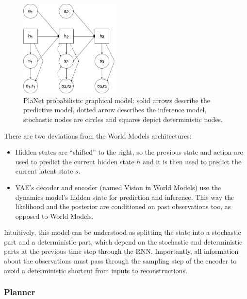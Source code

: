 \begin{figure}[H]
\includegraphics[width=0.45\textwidth,keepaspectratio]{figures/PlaNet/prob_graph_model.png}
\caption[World Models probabilistic graphical model]{PlaNet probabilistic graphical model: solid arrows describe the predictive model, dotted arrow describes the inference model, stochastic nodes are circles and squares depict deterministic nodes.}
\label{Fig.PlaNetPGM}
\end{figure}

\noindent There are two deviations from the World Models architectures:
\begin{itemize}
\item Hidden states are ``shifted'' to the right, so the previous state and action are used to predict the current hidden state $h$ and it is then used to predict the current latent state $s$.
\item VAE's decoder and encoder (named Vision in World Models) use the dynamics model's hidden state for prediction and inference. This way the likelihood and the posterior are conditioned on past observations too, as opposed to World Models.
\end{itemize}

Intuitively, this model can be understood as splitting the state into a stochastic part and a deterministic part, which depend on the stochastic and deterministic parts at the previous time step through the RNN. Importantly, all information about the observations must pass through the sampling step of the encoder to avoid a deterministic shortcut from inputs to reconstructions.

\subsubsection{Planner}

